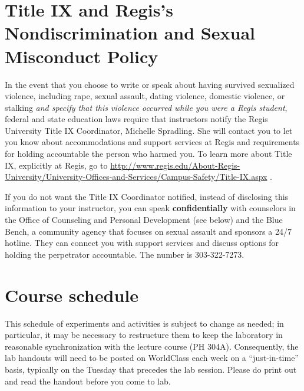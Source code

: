 \documentclass[11pt]{article}
\begin{document}
\section{Title IX and Regis's Nondiscrimination and Sexual Misconduct Policy}

In the event that you choose to write or speak about having survived sexualized violence, including rape, sexual assault, dating violence, domestic violence, or stalking {\em and specify that this violence occurred while you were a Regis student}, federal and state education laws require that instructors notify the Regis University Title IX Coordinator, Michelle Spradling. She will contact you to let you know about accommodations and support services at Regis and requirements for holding accountable the person who harmed you. To learn more about Title IX, explicitly at Regis, go to \url{http://www.regis.edu/About-Regis-University/University-Offices-and-Services/Campus-Safety/Title-IX.aspx} .

If you do not want the Title IX Coordinator notified, instead of disclosing this information to your instructor, you can speak {\bf confidentially} with counselors in the Office of Counseling and Personal Development (see below) and the Blue Bench, a community agency that focuses on sexual assault and sponsors a 24/7 hotline. They can connect you with support services and discuss options for holding the perpetrator accountable.  The number is 303-322-7273.

\newpage

\section{Course schedule}

This schedule of experiments and activities is subject to change as needed; 
in particular, it may be necessary to restructure them to keep the laboratory
in reasonable synchronization with the lecture course (PH 304A).
Consequently, the lab handouts will need to be posted on WorldClass
each week on a ``just-in-time'' basis, typically on the Tuesday that precedes 
the lab session.  Please do print out and read the handout before you
come to lab.

\medskip
\end{document}

